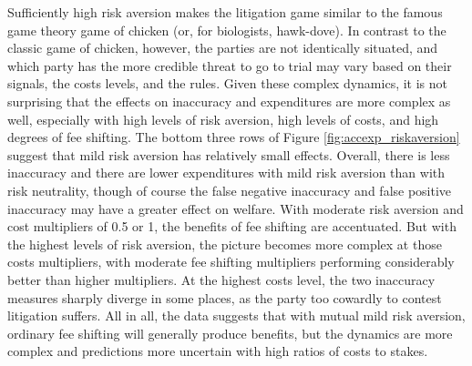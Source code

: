 \documentclass{article}
\begin{document}
Sufficiently high risk aversion makes the litigation game similar to the famous game theory game of chicken (or, for biologists, hawk-dove). In contrast to the classic game of chicken, however, the parties are not identically situated, and which party has the more credible threat to go to trial may vary based on their signals, the costs levels, and the rules. Given these complex dynamics, it is not surprising that the effects on inaccuracy and expenditures are more complex as well, especially with high levels of risk aversion, high levels of costs, and high degrees of fee shifting. The bottom three rows of Figure \ref{fig:accexp_riskaversion} suggest that mild risk aversion has relatively small effects. Overall, there is less inaccuracy and there are lower expenditures with mild risk aversion than with risk neutrality, though of course the false negative inaccuracy and false positive inaccuracy may have a greater effect on welfare. With moderate risk aversion and cost multipliers of 0.5 or 1, the benefits of fee shifting are accentuated. But with the highest levels of risk aversion, the picture becomes more complex at those costs multipliers, with moderate fee shifting multipliers performing considerably better than higher multipliers. At the highest costs level, the two inaccuracy measures sharply diverge in some places, as the party too cowardly to contest litigation suffers.  All in all, the data suggests that with mutual mild risk aversion, ordinary fee shifting will generally produce benefits, but the dynamics are more complex and predictions more uncertain with high ratios of costs to stakes.
\end{document}
